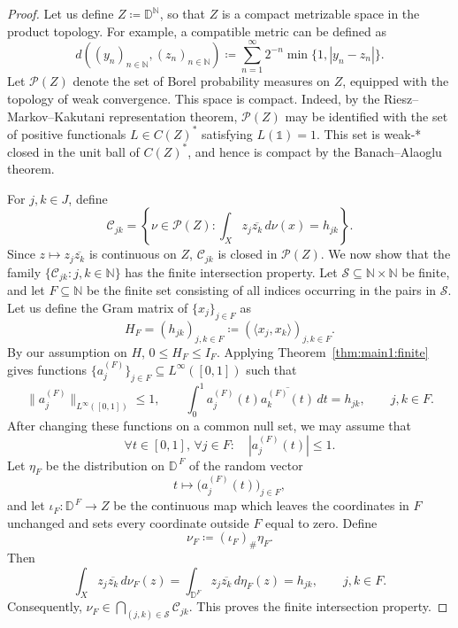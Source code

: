 \documentclass[reqno,a4paper,12pt]{amsart}
\numberwithin{equation}{section}
\def\N{{\mathbb N}}
\def\D{{\mathbb D}}
\newcommand\1{\mathds{1}}
\begin{document}
\begin{proof}
Let us define $Z\coloneqq\D^{\N}$, so that $Z$ is a compact metrizable space in the product topology. For example, a compatible metric can be defined as
\begin{equation*}
d((y_n)_{n\in\N},(z_n)_{n\in\N})
\coloneqq
\sum_{n=1}^\infty
2^{-n}\min\{1,|y_{n}-z_{n}|\}.
\end{equation*}
Let $\mathcal P(Z)$ denote the set of Borel probability measures
on $Z$, equipped with the topology of weak convergence. This space
is compact. Indeed, by the Riesz--Markov--Kakutani representation theorem, $\mathcal P(Z)$ may be identified with the set of positive
functionals $L\in C(Z)^*$ satisfying $L(\mathds{1})=1$. This set is weak-*
closed in the unit ball of $C(Z)^*$, and hence is compact by the
Banach--Alaoglu theorem.

For $j,k\in J$, define
\begin{equation*}
\mathcal C_{jk}
=
\left\{
\nu\in\mathcal P(Z):
\int_X z_j\overline{z_k}\,d\nu(x)=h_{jk}
\right\}.
\end{equation*}
Since $z\longmapsto z_j\overline{z_k}$ is continuous on $Z$, $\mathcal C_{jk}$ is closed in
$\mathcal P(Z)$. We now show that the family $\{\mathcal C_{jk}:j,k\in \N\}$ has the finite intersection property. Let $\mathcal S\subseteq \N\times \N$ be finite, and let $F\subseteq \N$ be the finite set consisting of all indices occurring in the pairs in $\mathcal S$. Let us define the Gram matrix of $\{ x_j \}_{j \in F}$ as 
\begin{equation*}
    H_F= (h_{jk})_{j,k\in F}\coloneqq (\langle x_j, x_k\rangle)_{j,k\in F}.
\end{equation*}
By our assumption on $H$, $0\le H_F\le I_F$. Applying Theorem~\ref{thm:main1:finite} gives functions $\{a_j^{(F)}\}_{j\in F}\subseteq L^\infty([0,1])$ such that
\begin{equation*}
\|a_j^{(F)}\|_{L^\infty([0,1])}\le1,
\qquad
\int_0^1
a_j^{(F)}(t)\overline{a_k^{(F)}(t)}\,dt
=
h_{jk},
\qquad j,k\in F.
\end{equation*}
After changing these functions on a common null set, we may assume
that
\begin{equation*}
\forall t\in [0,1],\, \forall j\in F:\quad\left|a_j^{(F)}(t)\right|\le1.
\end{equation*}
Let $\eta_F$ be the distribution on
$\D^{\,F}$ of the random vector
\begin{equation*}
    t\longmapsto
    \bigl(a_j^{(F)}(t)\bigr)_{j\in F},
\end{equation*}
and let $\iota_F:\D^{\,F}\to Z$ be the continuous map which leaves the coordinates in $F$
unchanged and sets every coordinate outside $F$ equal to zero. Define
\begin{equation*}
\nu_F\coloneqq(\iota_F)_\#\eta_F.
\end{equation*}
Then
\begin{equation*}
    \int_X z_j\overline{z_k}\,d\nu_F(z)
    =
    \int_{\D^F} z_j\overline{z_k}\, d\eta_F(z)
    = h_{jk},
    \qquad j,k\in F.
\end{equation*}
Consequently, $\nu_F\in
\bigcap_{(j,k)\in\mathcal S}\mathcal C_{jk}$. This proves the finite intersection property.


\end{proof}
\end{document}
